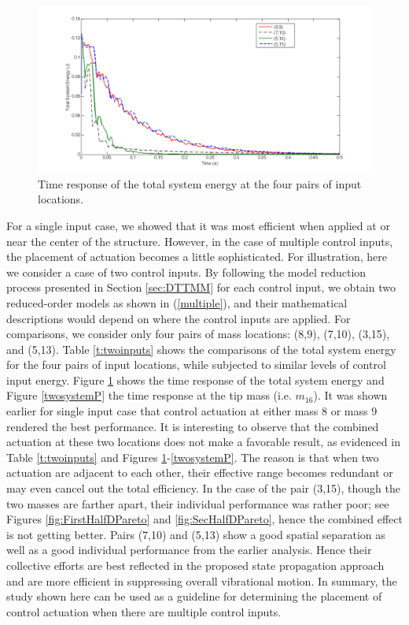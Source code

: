 \documentclass[11pt]{ucthesis}
\begin{document}
\begin{figure}[thpb]
\centering
\includegraphics[width=1\linewidth]{Figures/twoinputE.png}
\caption{Time response of the total system energy at the four pairs of input locations.}
\label{twosystemE}
\end{figure}

For a single input case, we showed that it was most efficient when applied at or near the center of the structure. However, in the case of multiple control inputs, the placement of actuation becomes a little sophisticated. For illustration, here we consider a case of two control inputs. By following the model reduction process presented in Section \ref{sec:DTTMM} for each control input, we obtain two reduced-order models as shown in (\ref{multiple}), and their mathematical descriptions would depend on where the control inputs are applied. For comparisons, we consider only four pairs of mass locations: (8,9), (7,10), (3,15), and (5,13). Table \ref{t:twoinputs} shows the comparisons of the total system energy for the four pairs of input locations, while subjected to similar levels of control input energy. Figure \ref{twosystemE} shows the time response of the total system energy and Figure \ref{twosystemP} the time response at the tip mass (i.e. $m_{16}$). It was shown earlier for single input case that control actuation at either mass 8 or mass 9 rendered the best performance. It is interesting to observe that the combined actuation at these two locations does not make a favorable result, as evidenced in Table \ref{t:twoinputs} and Figures \ref{twosystemE}-\ref{twosystemP}. The reason is that when two actuation are adjacent to each other, their effective range becomes redundant or may even cancel out the total efficiency. In the case of the pair (3,15), though the two masses are farther apart, their individual performance was rather poor; see Figures \ref{fig:FirstHalfDPareto} and \ref{fig:SecHalfDPareto}, hence the combined effect is not getting better. Pairs (7,10) and (5,13) show a good spatial separation as well as a good individual performance from the earlier analysis. Hence their collective efforts are best reflected in the proposed state propagation approach and are more efficient in suppressing overall vibrational motion. In summary, the study shown here can be used as a guideline for determining the placement of control actuation when there are multiple control inputs.
\end{document}
